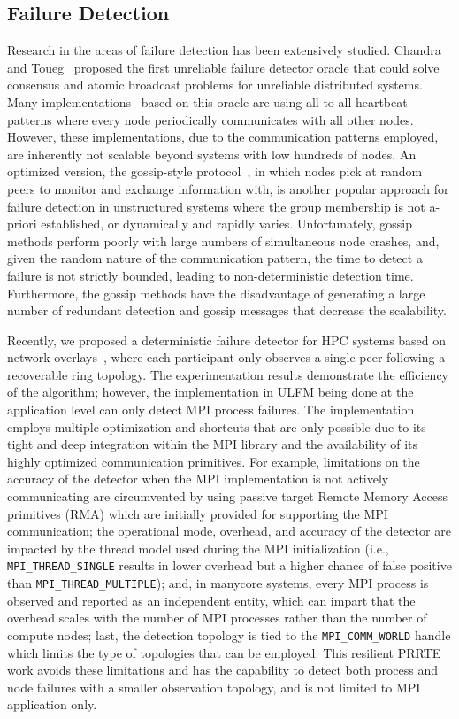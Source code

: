 \documentclass[5p,times,twocolumn]{elsarticle}
\newcommand{\mpifunc}[1]{\lstinline"MPI_#1"\xspace}
\newcommand{\prrte}[0]{\textsc{PRRTE}\xspace}
\newcommand{\ulfm}[0]{\textsc{ULFM}\xspace}
\newcommand{\mpi}[0]{\textsc{MPI}\xspace}
\begin{document}
\subsection{Failure Detection}
Research in the areas of failure detection has been extensively studied. Chandra and Toueg~\cite{Chandra96} proposed the first unreliable failure detector oracle that could solve consensus and atomic broadcast problems for unreliable distributed systems. Many implementations~\cite{Wei02, Larrea00, Kawazoe97} based on this oracle are using all-to-all heartbeat patterns where every node periodically communicates with all other nodes. However, these implementations, due to the communication patterns employed, are inherently not scalable beyond  systems with low hundreds of nodes. An optimized version, the gossip-style protocol~\cite{van98, Ranganathan01, Gupta01, Abhinandan02}, in which nodes pick at random peers to monitor and exchange information with, is another popular approach for failure detection in unstructured systems where the group membership is not a-priori established, or dynamically and rapidly varies. Unfortunately, gossip methods perform poorly with large numbers of simultaneous node crashes, and, given the random nature of the communication pattern, the time to detect a failure is not strictly bounded, leading to non-deterministic detection time. Furthermore, the gossip methods have the disadvantage of generating a large number of redundant detection and gossip messages that decrease the scalability.

Recently, we proposed a deterministic failure detector for HPC systems based on network overlays~\cite{George16}, where each participant only observes a single peer following a recoverable ring topology.
The experimentation results demonstrate the efficiency of the algorithm; however, the implementation in \ulfm being done at the application level can only detect \mpi process failures. The
implementation employs multiple optimization and shortcuts that are only possible due to
its tight and deep integration within the \mpi library and the availability of
 its highly optimized communication primitives. For example, limitations on the
accuracy of the detector when the \mpi implementation is not actively communicating
are circumvented by using passive target Remote Memory Access primitives (RMA) which are
initially provided for supporting the \mpi communication; the operational
mode, overhead, and accuracy of the detector are impacted by the thread model used
during the \mpi initialization (i.e., \mpifunc{THREAD_SINGLE} results
in lower overhead but a higher chance of false positive than \mpifunc{THREAD_MULTIPLE});
and, in manycore systems, every \mpi process
is observed and reported as an independent entity, which can impart that the
overhead scales with the number of \mpi processes rather than the number of
compute nodes; last, the detection topology is tied to the \mpifunc{COMM_WORLD}
handle which limits the type of topologies that can be employed.
This resilient \prrte work
avoids these limitations and has the capability to detect both process and
node failures with a smaller observation topology, and is not limited to
\mpi application only.
\end{document}
